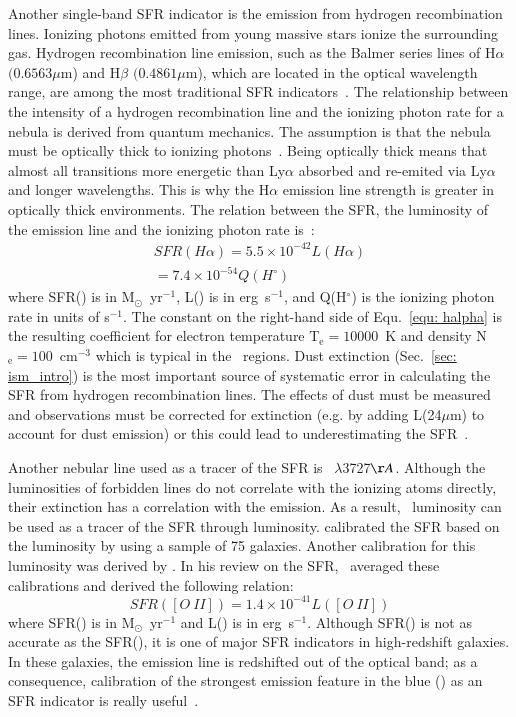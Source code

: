 Another single-band SFR indicator is the emission from hydrogen recombination lines. 
Ionizing photons emitted from young massive stars ionize the surrounding gas. Hydrogen recombination line emission, such as the Balmer series lines of H${\alpha}$ $(0.6563 \mu$m) and H${\beta}$ $(0.4861 \mu$m), which are located in the optical wavelength range, are among the most traditional SFR indicators~\citep{Kennicutt98a}. 
The relationship between the intensity of a hydrogen recombination line and the ionizing photon rate for a nebula is derived from quantum mechanics. 
The assumption is that the nebula must be optically thick to ionizing photons~\citep{Osterbrock06}.
Being optically thick means that almost all transitions more energetic than Ly${\alpha}$ absorbed and re-emited via Ly${\alpha}$ and longer wavelengths.
This is why the H${\alpha}$ emission line strength is greater in optically thick environments. The relation between the SFR, the luminosity of the \halpha emission line and the ionizing photon rate is~\citep[e.g.,][]{Osterbrock06, Kennicutt98b}:
\begin{align}
\label{equ: halpha}
SFR(H\alpha) = 5.5 \times 10^{-42}L(H\alpha) \\
                     = 7.4 \times 10^{-54}Q(H^{\circ})
\end{align}
where SFR(\halpha) is in M$_{\odot}$~yr$^{-1}$, L(\halpha) is in erg~s$^{-1}$, and Q(H$^{\circ}$) is the ionizing photon rate in units of s$^{-1}$.
The constant on the right-hand side of Equ.~\ref{equ: halpha} is the resulting coefficient for electron temperature T$_{\mathrm{e}}=10000$~K and density N$_{\mathrm{e}}=100$~cm$^{-3}$ which is typical in the \hii~regions.
Dust extinction (Sec.~\ref{sec: ism_intro}) is the most important source of systematic error in calculating the SFR from hydrogen recombination lines.
The effects of dust must be measured and \halpha observations must be corrected for extinction (e.g. by adding L(24$\mu$m) to account for dust emission) or this could lead to underestimating the SFR~\citep{Kennicutt98b}.


Another nebular line used as a tracer of the SFR is \oii~$\lambda$3727$\AA$. 
Although the luminosities of forbidden lines do not correlate with the ionizing atoms directly, their extinction has a correlation with the \halpha emission. 
As a result, \oii~luminosity can be used as a tracer of the SFR through \halpha luminosity. 
\cite{Gallagher89} calibrated the SFR based on the \oii luminosity by using a sample of 75 galaxies. 
Another calibration for this luminosity was derived by \cite{Kennicutt92}. 
In his review on the SFR,~\citep{Kennicutt98b} averaged these calibrations and derived the following relation:
\begin{equation}
SFR([O\ II]) = 1.4 \times 10^{-41} L([O\ II])
\end{equation}  
where SFR(\oii) is in M$_{\odot}$~yr$^{-1}$ and L(\oii) is in erg~s$^{-1}$.
Although SFR(\oii) is not as accurate as the SFR(\halpha), it is one of major SFR indicators in high-redshift galaxies.
In these galaxies, the \halpha emission line is redshifted out of the optical band; as a consequence, calibration of the strongest emission feature in the blue (\oii) as an SFR indicator is really useful~\citep{Kennicutt98b}.


